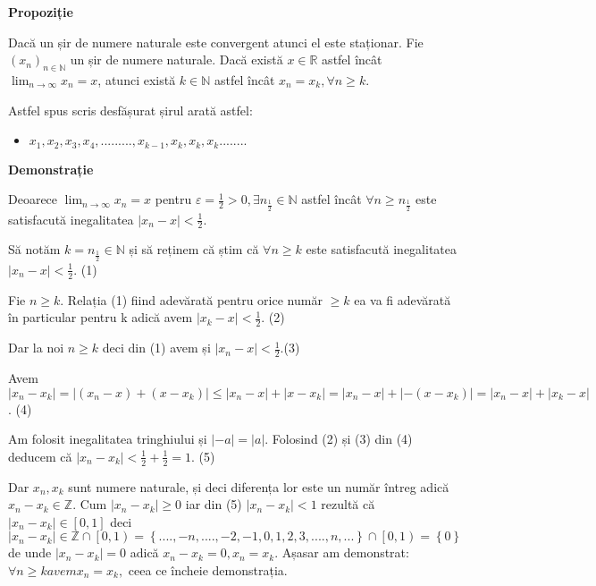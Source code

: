 \documentclass[a4paper,12pt,oneside]{report}
\begin{document}
\textbf{Propoziție}

Dacă un șir de numere naturale este convergent atunci el este staționar. 
Fie \((x_{n})_{n\in \mathbb{N}}\) un șir de numere naturale. Dacă există \(x\in \mathbb{R}\) astfel încât \(\lim_{n \to \infty }x_{n}= x\), atunci există \(k\in \mathbb{N}\) astfel încât \(x_{n}= x_{k}, \forall n\geq k\).
	
Astfel spus scris desfășurat șirul arată astfel:

\begin{itemize}
  \item \(x_{1},x_{2},x_{3},x_{4},.........,x_{k-1},x_{k},x_{k},x_{k}........\)
\end{itemize}


\textbf{Demonstrație}

Deoarece \(\lim_{n \to \infty }x_{n}= x\) pentru \(\varepsilon = \frac{1}{2}> 0, \exists n_{\frac{1}{2}}\in \mathbb{N}\) astfel încât \(\forall n\geq n_{\frac{1}{2}}\) este satisfacută inegalitatea \(\left | x_{n} -x \right |<  \frac{1}{2}\). 
	
Să notăm \(k=n_{\frac{1}{2}}\in \mathbb{N}\) și să reținem că știm că \(\forall n\geq k \) este satisfacută inegalitatea \(\left | x_{n} -x \right |< \frac{1}{2}\). (1) 

Fie \(n\geq k\). Relația (1) fiind adevărată pentru orice număr \(\geq k\) ea va fi adevărată în particular pentru k adică avem \(\left | x_{k}-x \right |< \frac{1}{2}\). (2)

Dar la noi \(n\geq k\) deci din (1) avem și \(\left | x_{n}-x \right |< \frac{1}{2}\).(3)

Avem \(\left | x_{n}-x_{k} \right |= \left | (x_{n}-x)+(x-x_{k}) \right |\leq \left | x_{n}-x \right |+\left | x-x_{k} \right |= \left | x_{n}-x \right |+ \left | -(x-x_{k}) \right |= \left | x_{n}-x \right |+ \left | x_{k} -x\right |\). (4)

Am folosit inegalitatea tringhiului și \(\left | -a \right |= \left | a \right |\). Folosind (2) și (3) din (4) deducem că \(\left | x_{n}-x_{k} \right |< \frac{1}{2}+ \frac{1}{2}= 1\). (5) 

Dar \(x_{n}, x_{k}\) sunt numere naturale, și deci diferența lor este un număr întreg adică \(x_{n}- x_{k}\in \mathbb{Z}\). Cum \(\left |x_{n}- x_{k} \right |\geq 0\) iar din (5) \(\left |x_{n}- x_{k} \right |< 1\) rezultă că \(\left |x_{n}- x_{k} \right |\in \left [ 0,1 \right ]\) deci \(\left |x_{n}- x_{k} \right |\in\mathbb{Z}\cap \left [ 0,1 \right)= \left \{ ....,-n ,....,-2,-1,0,1,2,3,....,n,... \right \}\cap \left [ 0,1 \right )= \left \{ 0 \right \}\) de unde \(\left | x_{n}-x_{k} \right |=0\) adică \(x_{n}-x_{k}=0,x_{n}=x_{k}.\) Așasar am demonstrat: \(\forall n\geq k avem x_{n}=x_{k},\) ceea ce încheie demonstrația. 
\end{document}
